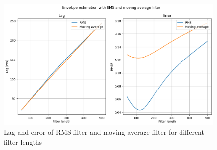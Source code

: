 \begin{figure}[h!t]
	\begin{center}
		\includegraphics[width=1.0\columnwidth]{images/lagerror_rms_and_MA_filter.png}
	\end{center}
	\caption{Lag and error of RMS filter and moving average filter for different filter lengths}
	\label{fig:lagerror_RMS_MA}
\end{figure}